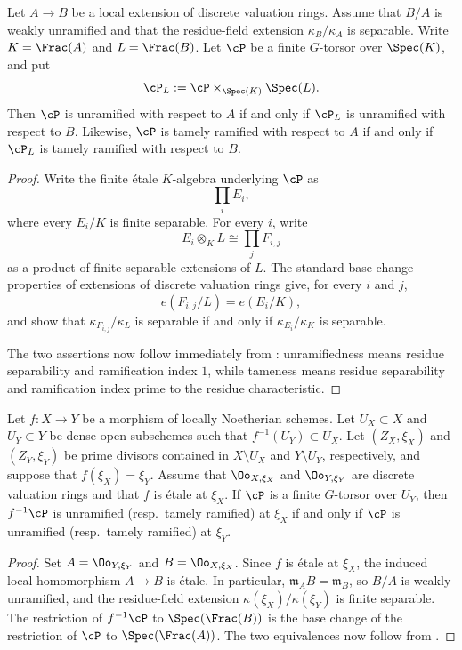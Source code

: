 \begin{lemma}\label{lemma:weakly_unramified_base_change}%
\label{lemma:descend_ramification_along_etale}
Let $A\to B$ be a local extension of discrete valuation rings. Assume that
$B/A$ is weakly unramified and that the residue-field extension
$\kappa_B/\kappa_A$ is separable. Write $K=\Frac(A)$ and $L=\Frac(B)$.
Let $\cP$ be a finite $G$-torsor over $\Spec(K)$, and put
\[
    \cP_L:=\cP\times_{\Spec(K)}\Spec(L).
\]
Then $\cP$ is unramified with respect to $A$ if and only if $\cP_L$ is
unramified with respect to $B$. Likewise, $\cP$ is tamely ramified with
respect to $A$ if and only if $\cP_L$ is tamely ramified with respect to $B$.
\end{lemma}
\begin{proof}
Write the finite étale $K$-algebra underlying $\cP$ as
\[
    \prod_i E_i,
\]
where every $E_i/K$ is finite separable. For every $i$, write
\[
    E_i\otimes_K L\cong\prod_j F_{i,j}
\]
as a product of finite separable extensions of $L$. The standard base-change
properties of extensions of discrete valuation rings give, for every $i$ and
$j$,
\[
    e(F_{i,j}/L)=e(E_i/K),
\]
and show that $\kappa_{F_{i,j}}/\kappa_L$ is separable if and only if
$\kappa_{E_i}/\kappa_K$ is separable.

The two assertions now follow immediately from
: unramifiedness means residue
separability and ramification index $1$, while tameness means residue
separability and ramification index prime to the residue characteristic.
\end{proof}

\begin{cor*}
Let $f:X\to Y$ be a morphism of locally Noetherian schemes. Let
$U_X\subset X$ and $U_Y\subset Y$ be dense open subschemes such that
$f^{-1}(U_Y)\subset U_X$. Let $(Z_X,\xi_X)$ and $(Z_Y,\xi_Y)$ be prime
divisors contained in $X\setminus U_X$ and $Y\setminus U_Y$, respectively,
and suppose that $f(\xi_X)=\xi_Y$. Assume that
$\Oo_{X,\xi_X}$ and $\Oo_{Y,\xi_Y}$ are discrete valuation rings and that
$f$ is étale at $\xi_X$. If $\cP$ is a finite $G$-torsor over $U_Y$, then
$f^{-1}\cP$ is unramified (resp.\ tamely ramified) at $\xi_X$ if and only if
$\cP$ is unramified (resp.\ tamely ramified) at $\xi_Y$.
\end{cor*}
\begin{proof}
Set $A=\Oo_{Y,\xi_Y}$ and $B=\Oo_{X,\xi_X}$. Since $f$ is étale at
$\xi_X$, the induced local homomorphism $A\to B$ is étale. In particular,
$\mathfrak m_A B=\mathfrak m_B$, so $B/A$ is weakly unramified, and the
residue-field extension $\kappa(\xi_X)/\kappa(\xi_Y)$ is finite separable.
The restriction of $f^{-1}\cP$ to $\Spec(\Frac(B))$ is the base change of
the restriction of $\cP$ to $\Spec(\Frac(A))$. The two equivalences now
follow from .
\end{proof}

